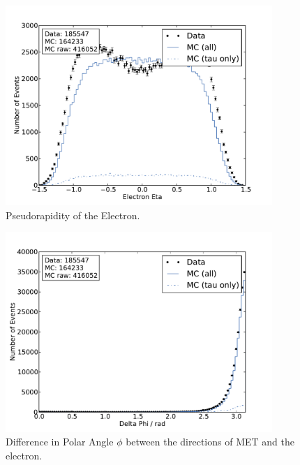 \documentclass[
	paper=A4,
	parskip=full,
	chapterprefix=true,
	11pt,
	headings=normal,
	bibliography=totoc,
	listof=totoc,
	titlepage=on,
]{scrreprt}
\begin{document}
\begin{figure}[htbp]
	\centering
	\includegraphics[width=0.9\textwidth]{nocuts/eta_el}
	\caption{Pseudorapidity of the Electron.}
	\label{fig:no_cuts_eta}
\end{figure}
\begin{figure}[htbp]
	\centering
	\includegraphics[width=0.9\textwidth]{nocuts/delta_phi}
	\caption{Difference in Polar Angle $\phi$ between the directions of MET and the electron.}
	\label{fig:no_cuts_dphi}
\end{figure}
\end{document}
